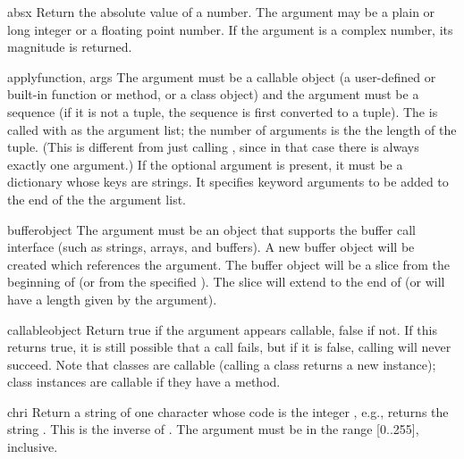 \begin{funcdesc}{abs}{x}
  Return the absolute value of a number.  The argument may be a plain
  or long integer or a floating point number.  If the argument is a
  complex number, its magnitude is returned.
\end{funcdesc}

\begin{funcdesc}{apply}{function, args}
The  argument must be a callable object (a user-defined or
built-in function or method, or a class object) and the 
argument must be a sequence (if it is not a tuple, the sequence is
first converted to a tuple).  The  is called with
 as the argument list; the number of arguments is the the length
of the tuple.  (This is different from just calling
, since in that case there is always
exactly one argument.)
If the optional  argument is present, it must be a
dictionary whose keys are strings.  It specifies keyword arguments to
be added to the end of the the argument list.
\end{funcdesc}

\begin{funcdesc}{buffer}{object}
The  argument must be an object that supports the
buffer call interface (such as strings, arrays, and buffers). A new
buffer object will be created which references the  argument.
The buffer object will be a slice from the beginning of 
(or from the specified ). The slice will extend to the
end of  (or will have a length given by the 
argument).
\end{funcdesc}

\begin{funcdesc}{callable}{object}
Return true if the  argument appears callable, false if
not.  If this returns true, it is still possible that a call fails,
but if it is false, calling  will never succeed.  Note
that classes are callable (calling a class returns a new instance);
class instances are callable if they have a  method.
\end{funcdesc}

\begin{funcdesc}{chr}{i}
  Return a string of one character whose \ASCII{} code is the integer
  , e.g.,  returns the string .  This is the
  inverse of .  The argument must be in the range [0..255],
  inclusive.
\end{funcdesc}

